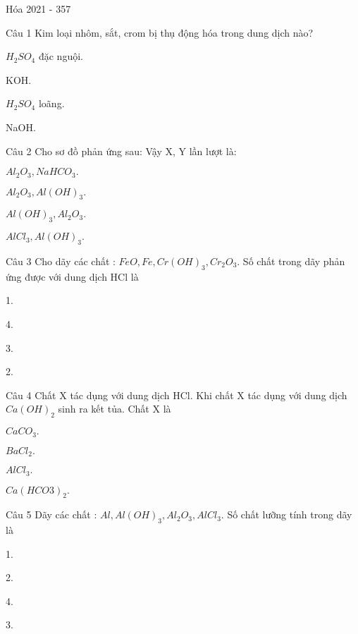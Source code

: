 \documentclass{book}
\begin{document}
\begin{quiz}{Hóa 2021 - 357}

\begin{multi}[points=1]{Câu 1}
 Kim loại nhôm, sắt, crom bị thụ động hóa trong dung dịch nào?

\item*  $H_2SO_4$ đặc nguội.	
\item  KOH.	
\item  $H_2SO_4$ loãng.	
\item  NaOH.
\end{multi}

\begin{multi}[points=1]{Câu 2}
 Cho sơ đồ phản ứng sau: Vậy X, Y lần lượt là: 

\item  $Al_2O_3, NaHCO_3.$	
\item*  $Al_2O_3, Al(OH)_3.$	
\item  $Al(OH)_3, Al_2O_3.$	
\item  $AlCl_3, Al(OH)_3.$
\end{multi}

\begin{multi}[points=1]{Câu 3}
 Cho dãy các chất : $FeO, Fe, Cr(OH)_3, Cr_2O_3$. Số chất trong dãy phản ứng được với dung dịch HCl là 

\item  1.	
\item*  4.	
\item  3.	
\item  2.
\end{multi}

\begin{multi}[points=1]{Câu 4}
 Chất X tác dụng với dung dịch HCl. Khi chất X tác dụng với dung dịch $Ca(OH)_2$ sinh ra kết tủa. Chất X là

\item  $CaCO_3.$	
\item  $BaCl_2.$	
\item  $AlCl_3.$	
\item*  $Ca(HCO3)_2.$
\end{multi}

\begin{multi}[points=1]{Câu 5}
 Dãy các chất : $Al, Al(OH)_3, Al_2O_3, AlCl_3$. Số chất lưỡng tính trong dãy là

\item  1.	
\item*  2.	
\item  4.	
\item  3.
\end{multi}


\end{quiz}
\end{document}
